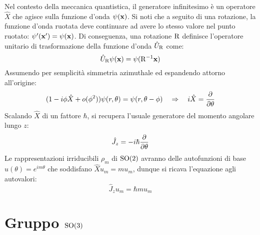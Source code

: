 Nel contesto della meccanica quantistica, il generatore infinitesimo è un operatore $ \hat{X} $ che agisce sulla funzione d'onda $ \psi(\mathbf{x}) $. Si noti che a seguito di una rotazione, la funzione d'onda ruotata deve continuare ad avere lo stesso valore nel punto ruotato: $ \psi'(\mathbf{x}') = \psi(\mathbf{x}) $. Di conseguenza, una rotazione $ \mathrm{R} $ definisce l'operatore unitario di trasformazione della funzione d'onda $ \hat{U}_{\mathrm{R}} $ come:
\begin{equation}
	\hat{U}_{\mathrm{R}} \psi(\mathbf{x}) = \psi(\mathrm{R}^{-1} \mathbf{x})
	\label{eq:9.7}
\end{equation}
Assumendo per semplicità simmetria azimuthale ed espandendo attorno all'origine:
\begin{equation*}
	(1 - i \phi \hat{X} + o(\phi^2)) \psi(r, \theta) = \psi(r, \theta - \phi)
	\quad \Rightarrow \quad
	i \hat{X} = \frac{\partial}{\partial \theta}
\end{equation*}
Scalando $ \hat{X} $ di un fattore $ \hbar $, si recupera l'usuale generatore del momento angolare lungo $ z $:
\begin{equation}
	\hat{J}_z = -i\hbar \frac{\partial}{\partial \theta}
	\label{eq:9.8}
\end{equation}
Le rappresentazioni irriducibili $ \rho_m $ di $ \mathrm{SO}(2) $ avranno delle autofunzioni di base $ u(\theta) = e^{im\theta} $ che soddisfano $ \hat{X} u_m = m u_m $, dunque si ricava l'equazione agli autovalori:
\begin{equation}
	\hat{J}_z u_m = \hbar m u_m
	\label{eq:9.9}
\end{equation}

\section{Gruppo \texorpdfstring{$ \mathrm{SO}(3) $}{TEXT}}

